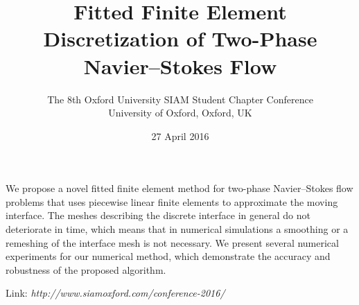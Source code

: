 \documentclass{article}
\begin{document}
\title{Fitted Finite Element Discretization of Two-Phase Navier--Stokes Flow}
\date{27 April 2016}
\author{The 8th Oxford University SIAM Student Chapter Conference\\
University of Oxford, Oxford, UK}

\maketitle

We propose a novel fitted finite element method for two-phase Navier--Stokes
flow problems that uses piecewise linear finite elements to approximate the
moving interface. The meshes describing the discrete interface in general do not
deteriorate in time, which means that in numerical simulations a smoothing or a
remeshing of the interface mesh is not necessary. We present several numerical
experiments for our numerical method, which demonstrate the accuracy and
robustness of the proposed algorithm.
\newline

Link: \emph{http://www.siamoxford.com/conference-2016/}
\end{document}
